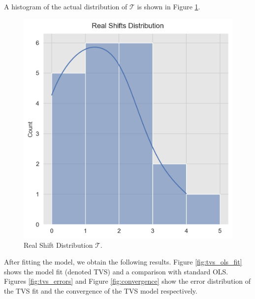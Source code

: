 \documentclass[11pt]{amsart}
\begin{document}
A histogram of the actual distribution of $\mathcal{T}$ is shown in Figure \ref{fig:real_shifts}.

\begin{center}
\begin{figure}
\includegraphics[scale=0.5]{images/real_shifts.png}
\caption{Real Shift Distribution $\mathcal{T}$.}
\label{fig:real_shifts}
\end{figure}
\end{center}

After fitting the model, we obtain the following results. Figure \ref{fig:tvs_ols_fit} shows the model fit (denoted TVS) and a comparison with standard OLS. Figures \ref{fig:tvs_errors} and Figure \ref{fig:convergence} show the error distribution of the TVS fit and the convergence of the TVS model respectively.
\end{document}
